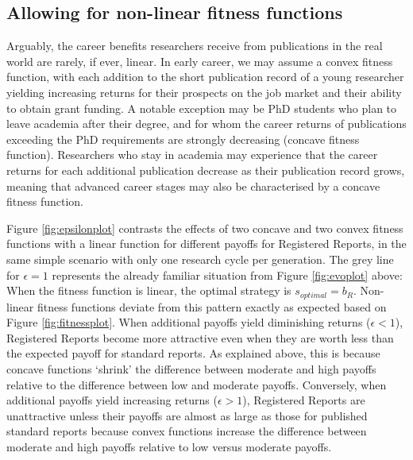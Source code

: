 \documentclass[
  ,man,mask,floatsintext]{apa6}
\begin{document}
\hypertarget{allowing-for-non-linear-fitness-functions}{%
\subsection{Allowing for non-linear fitness functions}\label{allowing-for-non-linear-fitness-functions}}

Arguably, the career benefits researchers receive from publications in the real world are rarely, if ever, linear.
In early career, we may assume a convex fitness function, with each addition to the short publication record of a young researcher yielding increasing returns for their prospects on the job market and their ability to obtain grant funding.
A notable exception may be PhD students who plan to leave academia after their degree, and for whom the career returns of publications exceeding the PhD requirements are strongly decreasing (concave fitness function).
Researchers who stay in academia may experience that the career returns for each additional publication decrease as their publication record grows, meaning that advanced career stages may also be characterised by a concave fitness function.

Figure \ref{fig:epsilonplot} contrasts the effects of two concave
and two convex fitness functions
with a linear function
for different payoffs for Registered Reports, in the same simple scenario with only one research cycle per generation.
The grey line for \(\epsilon = 1\) represents the already familiar situation from Figure \ref{fig:evoplot} above:
When the fitness function is linear, the optimal strategy is \(s_{optimal} = b_{R}\).
Non-linear fitness functions deviate from this pattern exactly as expected based on Figure \ref{fig:fitnessplot}.
When additional payoffs yield diminishing returns (\(\epsilon <1\)), Registered Reports become more attractive even when they are worth less than the expected payoff for standard reports.
As explained above, this is because concave functions `shrink' the difference between moderate and high payoffs relative to the difference between low and moderate payoffs.
Conversely, when additional payoffs yield increasing returns (\(\epsilon > 1\)), Registered Reports are unattractive unless their payoffs are almost as large as those for published standard reports because convex functions increase the difference between moderate and high payoffs relative to low versus moderate payoffs.
\end{document}

